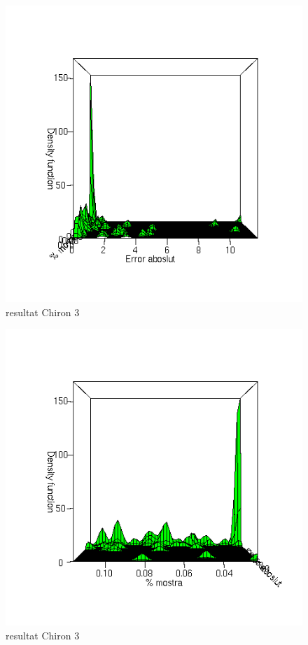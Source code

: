 	\begin{figure}[tbp]
		\begin{center}
			\includegraphics[scale=0.75]{chiron/rgrau3.png}
		\end{center}
		\caption{resultat Chiron 3}
		\label{fig:resChir3}
	\end{figure}
	\begin{figure}[tbp]
		\begin{center}
			\includegraphics[scale=0.75]{chiron/rgrau4.png}
		\end{center}
		\caption{resultat Chiron 3}
		\label{fig:resChir4}
	\end{figure}

